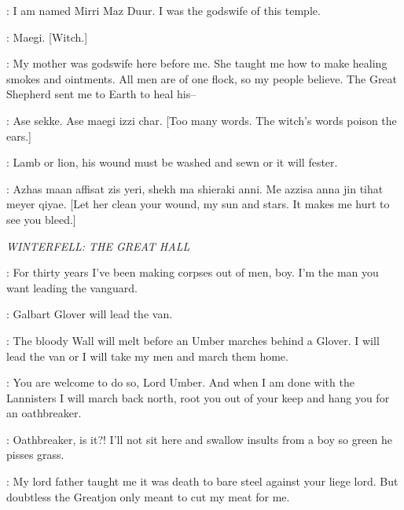 \MIRRI: I am named Mirri Maz Duur. I was the godswife of this temple.  

\RAKHARO: Maegi. [Witch.] 

\MIRRI: My mother was godswife here before me. She taught me how to make healing smokes and ointments. All men are of one flock, so my people believe. The Great Shepherd sent me to Earth to heal his--


\RAKHARO: Ase sekke. Ase maegi izzi char. [Too many words. The witch's words poison the ears.] 

\MIRRI: Lamb or lion, his wound must be washed and sewn or it will fester. 

\DAENERYS: Azhas maan affisat zis yeri, shekh ma shieraki anni. Me azzisa anna jin tihat meyer qiyae. [Let her clean your wound, my sun and stars. It makes me hurt to see you bleed.] 



\scene

\textit{WINTERFELL: THE GREAT HALL}


\UMBER: For thirty years I've been making corpses out of men, boy. I'm the man you want leading the vanguard. 

\ROBB: Galbart Glover will lead the van. 

\UMBER: The bloody Wall will melt before an Umber marches behind a Glover. I will lead the van or I will take my men and march them home. 

\ROBB: You are welcome to do so, Lord Umber.  And when I am done with the Lannisters I will march back north, root you out of your keep and hang you for an oathbreaker. 

\UMBER: Oathbreaker, is it?!  I'll not sit here and swallow insults from a boy so green he pisses grass. 


\ROBB: My lord father taught me it was death to bare steel against your liege lord. But doubtless the Greatjon only meant to cut my meat for me. 

